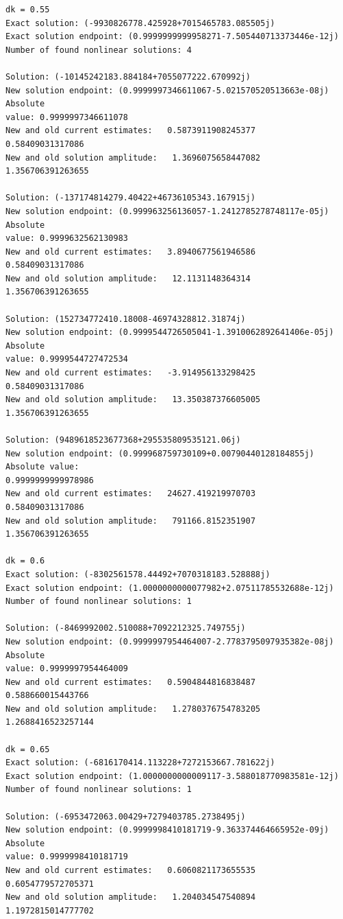 \documentclass[11pt]{article}
\begin{document}
\begin{Verbatim}[commandchars=\\\{\}]
dk = 0.55
Exact solution: (-9930826778.425928+7015465783.085505j)
Exact solution endpoint: (0.9999999999958271-7.505440713373446e-12j)
Number of found nonlinear solutions: 4

Solution: (-10145242183.884184+7055077222.670992j)
New solution endpoint: (0.9999997346611067-5.021570520513663e-08j) Absolute
value: 0.9999997346611078
New and old current estimates:   0.5873911908245377    0.58409031317086
New and old solution amplitude:   1.3696075658447082    1.356706391263655

Solution: (-137174814279.40422+46736105343.167915j)
New solution endpoint: (0.999963256136057-1.2412785278748117e-05j) Absolute
value: 0.9999632562130983
New and old current estimates:   3.8940677561946586    0.58409031317086
New and old solution amplitude:   12.1131148364314    1.356706391263655

Solution: (152734772410.18008-46974328812.31874j)
New solution endpoint: (0.9999544726505041-1.3910062892641406e-05j) Absolute
value: 0.9999544727472534
New and old current estimates:   -3.914956133298425    0.58409031317086
New and old solution amplitude:   13.350387376605005    1.356706391263655

Solution: (9489618523677368+295535809535121.06j)
New solution endpoint: (0.999968759730109+0.00790440128184855j) Absolute value:
0.9999999999978986
New and old current estimates:   24627.419219970703    0.58409031317086
New and old solution amplitude:   791166.8152351907    1.356706391263655

dk = 0.6
Exact solution: (-8302561578.44492+7070318183.528888j)
Exact solution endpoint: (1.0000000000077982+2.07511785532688e-12j)
Number of found nonlinear solutions: 1

Solution: (-8469992002.510088+7092212325.749755j)
New solution endpoint: (0.9999997954464007-2.7783795097935382e-08j) Absolute
value: 0.9999997954464009
New and old current estimates:   0.5904844816838487    0.588660015443766
New and old solution amplitude:   1.2780376754783205    1.2688416523257144

dk = 0.65
Exact solution: (-6816170414.113228+7272153667.781622j)
Exact solution endpoint: (1.0000000000009117-3.588018770983581e-12j)
Number of found nonlinear solutions: 1

Solution: (-6953472063.00429+7279403785.2738495j)
New solution endpoint: (0.9999998410181719-9.363374464665952e-09j) Absolute
value: 0.9999998410181719
New and old current estimates:   0.6060821173655535    0.6054779572705371
New and old solution amplitude:   1.204034547540894    1.1972815014777702


\end{Verbatim}
\end{document}
